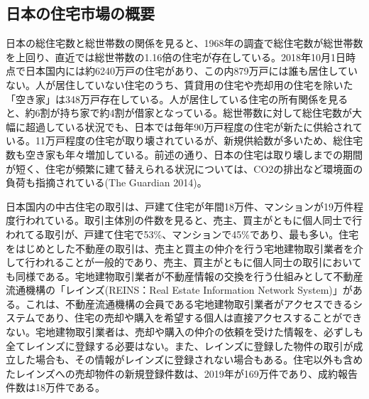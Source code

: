 \documentclass[a4paper,fontsize=11pt,report,notitlepage,line_length=38zw,number_of_lines=40,dvipdfmx]{jlreq}
\begin{document}
\subsection{日本の住宅市場の概要}
日本の総住宅数と総世帯数の関係を見ると、1968年の調査で総住宅数が総世帯数を上回り、直近では総世帯数の1.16倍の住宅が存在している。2018年10月1日時点で日本国内には約6240万戸の住宅があり、この内879万戸には誰も居住していない。人が居住していない住宅のうち、賃貸用の住宅や売却用の住宅を除いた「空き家」は348万戸存在している\cite{tochitokei}。人が居住している住宅の所有関係を見ると、約6割が持ち家で約4割が借家となっている。総世帯数に対して総住宅数が大幅に超過している状況でも、日本では毎年90万戸程度の住宅が新たに供給されている\cite{kenchikuchakkou}。11万戸程度の住宅が取り壊されているが、新規供給数が多いため、総住宅数も空き家も年々増加している。前述の通り、日本の住宅は取り壊しまでの期間が短く、住宅が頻繁に建て替えられる状況については、CO2の排出など環境面の負荷も指摘されている(The Guardian 2014)\cite{guardian}。

日本国内の中古住宅の取引は、戸建て住宅が年間18万件、マンションが19万件程度行われている。取引主体別の件数を見ると、売主、買主がともに個人同士で行われてる取引が、戸建て住宅で53\%、マンションで45\%であり、最も多い\cite{fudosantorihiki}。住宅をはじめとした不動産の取引は、売主と買主の仲介を行う宅地建物取引業者を介して行われることが一般的であり、売主、買主がともに個人同士の取引においても同様である。宅地建物取引業者が不動産情報の交換を行う仕組みとして不動産流通機構の「レインズ(REINS：Real Estate Information Network System)」がある。これは、不動産流通機構の会員である宅地建物取引業者がアクセスできるシステムであり、住宅の売却や購入を希望する個人は直接アクセスすることができない。宅地建物取引業者は、売却や購入の仲介の依頼を受けた情報を、必ずしも全てレインズに登録する必要はない。また、レインズに登録した物件の取引が成立した場合も、その情報がレインズに登録されない場合もある\cite{fudosanjoho}。住宅以外も含めたレインズへの売却物件の新規登録件数は、2019年が169万件であり、成約報告件数は18万件である\cite{shiteiryutsu}。
\end{document}
